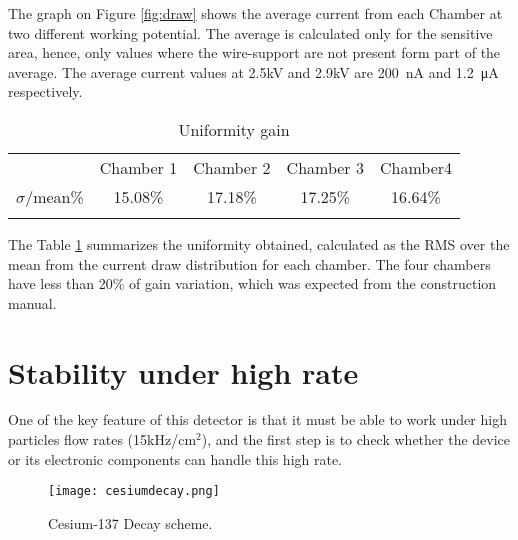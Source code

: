 The graph on Figure \ref{fig:draw} shows the average current from each Chamber at two different working potential. The
average is calculated only for the sensitive area, hence, only values where the wire-support are not present
form part of the average. The average current values at 2.5kV and 2.9kV are \SI{200}{nA} and \SI{1.2}{\micro A} respectively.\par 



\begin{table}
	\centering
	\begin{tabular}{ccccc}
	\hline
	& Chamber 1&Chamber 2 & Chamber 3 & Chamber4\\
	$\sigma$/mean\% 	
	 & 15.08\%  
& 17.18\%  
	 & 17.25\%  
	& 16.64\%  \\
	\hline\\
	\end{tabular}
	\caption{Uniformity gain}\label{table}
\end{table}

The Table \ref{table} summarizes the uniformity obtained, calculated as the RMS over the mean from the current draw
distribution for each chamber. The four chambers have less than 20\% of gain variation, which was expected from the
construction manual.\par



\section{Stability under high rate}\label{gifff}

One of the key feature of this detector is that it must be able to work under high particles flow
rates (\unit{15}{kHz/cm$^2$}), and the first step is
to check whether the device or its electronic components can handle this high rate.\par
\begin{figure}[ht]
	\hspace*{\fill}
	\texttt{[image: cesiumdecay.png]}
	\hspace*{\fill}
	\caption{Cesium-137 Decay scheme.}\label{cesium}
\end{figure}

